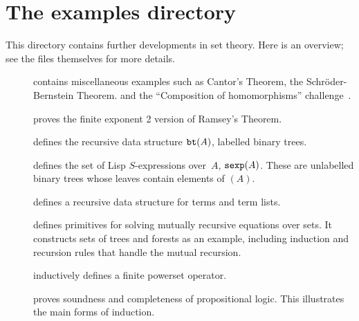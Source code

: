 \section{The examples directory}
This directory contains further developments in {\ZF} set theory.  Here is
an overview; see the files themselves for more details.
\begin{description}
\item[] contains miscellaneous examples such as
  Cantor's Theorem, the Schr\"oder-Bernstein Theorem.  and the
  ``Composition of homomorphisms'' challenge~\cite{boyer86}.

\item[]
proves the finite exponent 2 version of Ramsey's Theorem.

\item[]
defines the recursive data structure ${\tt bt}(A)$, labelled binary trees.

\item[]
defines the set of Lisp $S$-expressions over~$A$, ${\tt sexp}(A)$.  These
are unlabelled binary trees whose leaves contain elements of $(A)$.

\item[]
defines a recursive data structure for terms and term lists.

\item[]
defines primitives for solving mutually recursive equations over sets.
It constructs sets of trees and forests as an example, including induction
and recursion rules that handle the mutual recursion.

\item[]
inductively defines a finite powerset operator.

\item[]
proves soundness and completeness of propositional logic.  This illustrates
the main forms of induction.
\end{description}


